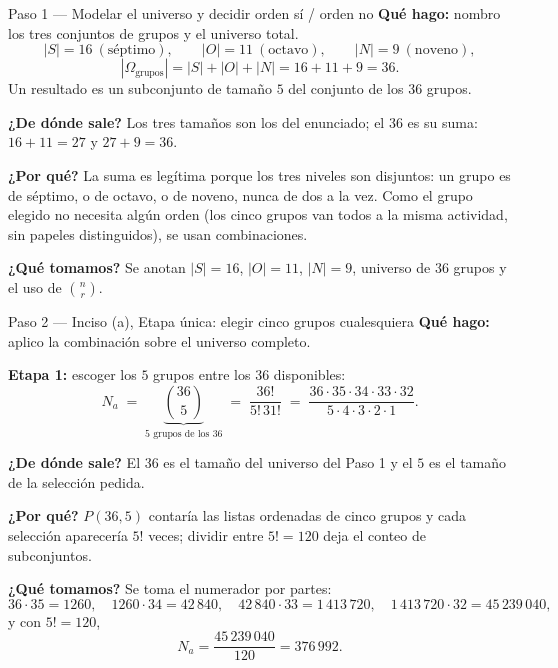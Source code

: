 \documentclass[11pt]{article}
\begin{document}
\begin{paso}{Paso 1 --- Modelar el universo y decidir orden sí / orden no}
\textbf{Qué hago:} nombro los tres conjuntos de grupos y el universo total.
\[
  |S| = 16 \ (\text{séptimo}),\qquad |O| = 11 \ (\text{octavo}),\qquad |N| = 9 \ (\text{noveno}),
\]
\[
  |\Omega_{\text{grupos}}| = |S|+|O|+|N| = 16+11+9 = 36 .
\]
Un resultado es un subconjunto de tamaño $5$ del conjunto de los $36$ grupos.

\textbf{¿De dónde sale?} Los tres tamaños son los del enunciado; el $36$ es su suma: $16+11=27$ y $27+9=36$.

\textbf{¿Por qué?} La suma es legítima porque los tres niveles son disjuntos: un grupo es de séptimo, o de octavo, o de noveno, nunca de dos a la vez. Como el grupo elegido no necesita algún orden (los cinco grupos van todos a la misma actividad, sin papeles distinguidos), se usan combinaciones.

\textbf{¿Qué tomamos?} Se anotan $|S|=16$, $|O|=11$, $|N|=9$, universo de $36$ grupos y el uso de $\binom{n}{r}$.
\end{paso}

\begin{paso}{Paso 2 --- Inciso (a), Etapa única: elegir cinco grupos cualesquiera}
\textbf{Qué hago:} aplico la combinación sobre el universo completo.

\medskip
\textbf{Etapa 1:} escoger los $5$ grupos entre los $36$ disponibles:
\[
  N_a \;=\; \underbrace{\binom{36}{5}}_{\text{5 grupos de los 36}} \;=\; \frac{36!}{5!\,31!} \;=\; \frac{36\cdot 35\cdot 34\cdot 33\cdot 32}{5\cdot 4\cdot 3\cdot 2\cdot 1} .
\]

\textbf{¿De dónde sale?} El $36$ es el tamaño del universo del Paso 1 y el $5$ es el tamaño de la selección pedida.

\textbf{¿Por qué?} $P(36,5)$ contaría las listas ordenadas de cinco grupos y cada selección aparecería $5!$ veces; dividir entre $5!=120$ deja el conteo de subconjuntos.

\textbf{¿Qué tomamos?} Se toma el numerador por partes:
\[
  36\cdot 35 = 1260,\quad 1260\cdot 34 = 42\,840,\quad 42\,840\cdot 33 = 1\,413\,720,\quad 1\,413\,720\cdot 32 = 45\,239\,040 ,
\]
y con $5!=120$,
\[
  N_a = \frac{45\,239\,040}{120} = 376\,992 .
\]
\end{paso}
\end{document}
